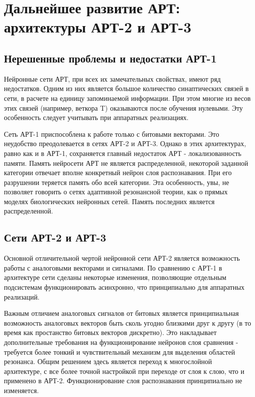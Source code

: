 \documentclass[12pt,a4paper,article]{article}
\begin{document}
\section{Дальнейшее развитие АРТ: архитектуры АРТ-2 и АРТ-3}
\subsection{Нерешенные проблемы и недостатки АРТ-1}
Нейронные сети АРТ, при всех их замечательных свойствах, имеют ряд недостатков. Одним из них является большое количество синаптических связей в сети, в расчете на единицу запоминаемой информации. При этом многие из весов этих связей (например, веткора T) оказываются после обучения нулевыми. Эту особенность следует учитывать при аппаратных реализациях.

Сеть АРТ-1 приспособлена к работе только с битовыми векторами. Это неудобство преодолевается в сетях АРТ-2 и АРТ-3. Однако в этих архитектурах, равно как и в АРТ-1, сохраняется главный недостаток АРТ - локализованность памяти. Память нейросети АРТ не является распределенной, некоторой заданной категории отвечает вполне конкретный нейрон слоя распознавания. При его разрушении теряется память обо всей категории. Эта особенность, увы, не позволяет говорить о сетях адаптивной резонансной теории, как о прямых моделях биологических нейронных сетей. Память последних является распределенной.

\subsection{Сети АРТ-2 и АРТ-3}
Основной отличительной чертой нейронной сети АРТ-2 является возможность работы с аналоговыми векторами и сигналами. По сравнению с АРТ-1 в архитектуре сети сделаны некоторые изменения, позволяющие отдельным подсистемам функционировать асинхронно, что принципиально для аппаратных реализаций.

Важным отличием аналоговых сигналов от битовых является принципиальная возможность аналоговых векторов быть сколь угодно близкими друг к другу (в то время как простанство битовых векторов дискретно). Это накладывает дополнительные требования на функционирование нейронов слоя сравнения - требуется более тонкий и чувствительный механизм для выделения областей резонанса. Общим решением здесь является переход к многослойной архитектуре, с все более точной настройкой при переходе от слоя к слою, что и применено в АРТ-2. Функционирование слоя распознавания принципиально не изменяется.
\end{document}
